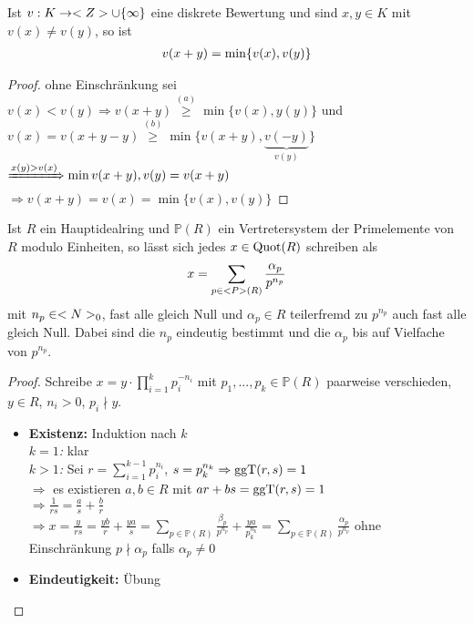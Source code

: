 \begin{lemma}
	Ist $v:K\to\whole\cup\{\infty\}$ eine diskrete Bewertung und sind $x,y\in K$ mit $v(x)\neq v(y)$, so ist
	\begin{align}
		v(x+y) = \min\{v(x),v(y)\}\notag
	\end{align}
\end{lemma}
\begin{proof}
	ohne Einschränkung sei $v(x)<v(y)\Rightarrow v(x+y)\overset{(a)}{\ge}\min\{v(x),y(y)\}$ und $v(x) = v(x+y-y) \overset{(b)}{\ge}\min\{v(x+y),\underbrace{v(-y)}_{v(y)}\}$ \\
	$\xRightarrow{x(y)>v(x)} \min{v(x+y),v(y)} = v(x+y)$ \\
	$\Rightarrow v(x+y) = v(x) = \min\{v(x),v(y)\}$
\end{proof}

\begin{proposition}
	Ist $R$ ein Hauptidealring und $\mathbb{P}(R)$ ein Vertretersystem der Primelemente von $R$ modulo Einheiten, so lässt sich jedes $x\in\Quot(R)$ schreiben als
	\begin{align}
		 x = \sum_{p\in\mathbb{P}(R)}  \frac{\alpha_p}{p^{n_p}} \notag
	\end{align}
	mit $n_p\in\natur_0$, fast alle gleich Null und $\alpha_p\in R$ teilerfremd zu $p^{n_p}$ auch fast alle gleich Null. Dabei sind die $n_p$ eindeutig bestimmt und die $\alpha_p$ bis auf Vielfache von $p^{n_p}$.
\end{proposition}
\begin{proof}
	Schreibe $x=y\cdot \prod_{i=1}^{k}p_i^{-n_i}$ mit $p_1,...,p_k\in\mathbb{P}(R)$ paarweise verschieden, $y\in R$, $n_i>0$, $p_i\nmid y$.
	\begin{itemize}
		\item \textbf{Existenz:} Induktion nach $k$ \\
		\emph{$k=1$:} klar \\
		\emph{$k>1$:} Sei $r=\sum_{i=1}^{k-1} p_i^{n_i}$, $s=p_k^{n_k}\Rightarrow \ggT(r,s)=1$ \\
		$\Rightarrow$ es existieren $a,b\in R$ mit $ar+bs = \ggT(r,s)=1$ \\
		$\Rightarrow \frac{1}{rs} = \frac{a}{s}+\frac{b}{r}$ \\
		$\Rightarrow x = \frac{y}{rs} = \frac{yb}{r} + \frac{ya}{s} = \sum_{p\in\mathbb{P}(R)}\frac{\beta_p}{p^{n_p}} + \frac{ya}{p_k^{n_k}} = \sum_{p\in\mathbb{P}(R)} \frac{\alpha_p}{p^{n_p}}$ ohne Einschränkung $p\nmid \alpha_p$ falls $\alpha_p\neq 0$
		\item \textbf{Eindeutigkeit:} Übung
	\end{itemize}
\end{proof}

